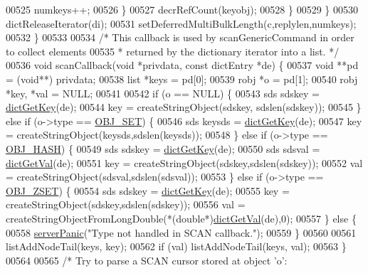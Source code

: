 \begin{DoxyCode}
00525                 numkeys++;
00526             \}
00527             decrRefCount(keyobj);
00528         \}
00529     \}
00530     dictReleaseIterator(di);
00531     setDeferredMultiBulkLength(c,replylen,numkeys);
00532 \}
00533 
00534 \textcolor{comment}{/* This callback is used by scanGenericCommand in order to collect elements}
00535 \textcolor{comment}{ * returned by the dictionary iterator into a list. */}
00536 \textcolor{keywordtype}{void} scanCallback(\textcolor{keywordtype}{void} *privdata, \textcolor{keyword}{const} dictEntry *de) \{
00537     \textcolor{keywordtype}{void} **pd = (\textcolor{keywordtype}{void}**) privdata;
00538     list *keys = pd[0];
00539     robj *o = pd[1];
00540     robj *key, *val = NULL;
00541 
00542     \textcolor{keywordflow}{if} (o == NULL) \{
00543         sds sdskey = \hyperlink{dict_8h_a3271c334309904a3086deca94f96e46e}{dictGetKey}(de);
00544         key = createStringObject(sdskey, sdslen(sdskey));
00545     \} \textcolor{keywordflow}{else} \textcolor{keywordflow}{if} (o->type == \hyperlink{server_8h_a8d179375a4aac33d3fa7aa80c8ccc75f}{OBJ\_SET}) \{
00546         sds keysds = \hyperlink{dict_8h_a3271c334309904a3086deca94f96e46e}{dictGetKey}(de);
00547         key = createStringObject(keysds,sdslen(keysds));
00548     \} \textcolor{keywordflow}{else} \textcolor{keywordflow}{if} (o->type == \hyperlink{server_8h_a87c05ba4f7f36741864277f02a4423fb}{OBJ\_HASH}) \{
00549         sds sdskey = \hyperlink{dict_8h_a3271c334309904a3086deca94f96e46e}{dictGetKey}(de);
00550         sds sdsval = \hyperlink{dict_8h_ae8d2cc391873b2bea2b87c4f80f43120}{dictGetVal}(de);
00551         key = createStringObject(sdskey,sdslen(sdskey));
00552         val = createStringObject(sdsval,sdslen(sdsval));
00553     \} \textcolor{keywordflow}{else} \textcolor{keywordflow}{if} (o->type == \hyperlink{server_8h_a8c356422ddbc03bd77694880a30a1953}{OBJ\_ZSET}) \{
00554         sds sdskey = \hyperlink{dict_8h_a3271c334309904a3086deca94f96e46e}{dictGetKey}(de);
00555         key = createStringObject(sdskey,sdslen(sdskey));
00556         val = createStringObjectFromLongDouble(*(\textcolor{keywordtype}{double}*)\hyperlink{dict_8h_ae8d2cc391873b2bea2b87c4f80f43120}{dictGetVal}(de),0);
00557     \} \textcolor{keywordflow}{else} \{
00558         \hyperlink{server_8h_a11cc378e7778a830b41240578de3b204}{serverPanic}(\textcolor{stringliteral}{"Type not handled in SCAN callback."});
00559     \}
00560 
00561     listAddNodeTail(keys, key);
00562     \textcolor{keywordflow}{if} (val) listAddNodeTail(keys, val);
00563 \}
00564 
00565 \textcolor{comment}{/* Try to parse a SCAN cursor stored at object 'o':}

\end{DoxyCode}
